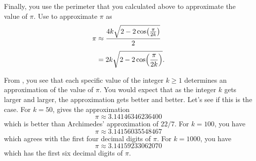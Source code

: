 \documentclass[a4paper,oneside,12pt]{article}
\begin{document}
Finally, you use the perimeter that you calculated above to
approximate the value of $\pi$.  Use
 to approximate $\pi$ as
\begin{equation}
\label{eqn:formula_approximate_pi}
\begin{aligned}
\pi
&\approx
\frac{
  4k\sqrt{
    2
    -
    2\cos\parenthesis*{\frac{\pi}{2k}}
  }
}{
  2
} \\[4pt]
&=
2k\sqrt{
  2
  -
  2\cos\parenthesis*{\frac{\pi}{2k}}
}.
\end{aligned}
\end{equation}

From , you see that each specific
value of the integer $k \geq 1$ determines an approximation of the
value of $\pi$.  You would expect that as the integer $k$ gets larger
and larger, the approximation gets better and better.  Let's see if
this is the case.  For $k = 50$, 
gives the approximation
\[
\pi
\approx
3.14146346236400
\]
which is better than Archimedes' approximation of $22 / 7$.  For
$k = 100$, you have
\[
\pi
\approx
3.14156035548467
\]
which agrees with the first four decimal digits of $\pi$.  For
$k = 1000$, you have
\[
\pi
\approx
3.14159233062070
\]
which has the first six decimal digits of $\pi$.
\end{document}
